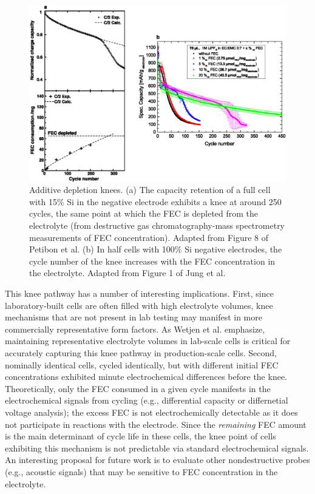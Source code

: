 \documentclass[journal=jpclcd,manuscript=article]{achemso}
\begin{document}
\begin{figure}[ht]
\centering
\includegraphics[scale = 0.9]{figures/fec_depletion.eps}
\caption{Additive depletion knees.
(a) The capacity retention of a full cell with 15\% Si in the negative electrode exhibits a knee at around 250 cycles, the same point at which the FEC is depleted from the electrolyte (from destructive gas chromatography-mass spectrometry measurements of FEC concentration). Adapted from Figure 8 of Petibon et al.\cite{petibon_studies_2016}
(b) In half cells with 100\% Si negative electrodes, the cycle number of the knee increases with the FEC concentration in the electrolyte. Adapted from Figure 1 of Jung et al.\cite{jung_consumption_2016}}
\label{fig:fec_knee}
\end{figure}

This knee pathway has a number of interesting implications.
First, since laboratory-built cells are often filled with high electrolyte volumes, knee mechanisms that are not present in lab testing may manifest in more commercially representative form factors.
As Wetjen et al.\cite{wetjen_differentiating_2017} emphasize,
maintaining representative electrolyte volumes in lab-scale cells is critical for accurately capturing this knee pathway in production-scale cells.
Second, nominally identical cells, cycled identically, but with different initial FEC concentrations exhibited minute electrochemical differences before the knee.\cite{jung_consumption_2016}
Theoretically, only the FEC consumed in a given cycle manifests in the electrochemical signals from cycling (e.g., differential capacity or differnetial voltage analysis); the excess FEC is not electrochemically detectable as it does not participate in reactions with the electrode.
Since the \emph{remaining} FEC amount is the main determinant of cycle life in these cells, the knee point of cells exhibiting this mechanism is not predictable via standard electrochemical signals.
An interesting proposal for future work is to evaluate other nondestructive probes (e.g., acoustic signals\cite{knehr_understanding_2018}) that may be sensitive to FEC concentration in the electrolyte.
\end{document}
